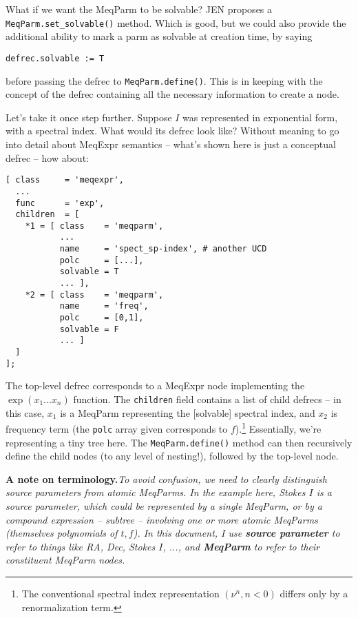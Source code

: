 \documentclass[]{lofar}
\begin{document}
  What if we want the MeqParm to be solvable? JEN \cite{PSS4} proposes a {\tt
  MeqParm.set\_solvable()} method. Which is good, but we could also provide the
  additional ability to mark a parm as solvable at creation time, by saying
  
\begin{verbatim}
defrec.solvable := T
\end{verbatim}
  
  before passing the defrec to {\tt MeqParm.define()}. This is in keeping with
  the concept of the defrec containing all the necessary information to create a
  node.
  
  Let's take it once step further. Suppose $I$ was represented in exponential
  form, with a spectral index. What would its defrec look like? Without meaning
  to go into detail about MeqExpr semantics -- what's shown here is just a
  conceptual defrec -- how about:
  
\begin{verbatim}
[ class     = 'meqexpr',
  ...
  func      = 'exp',
  children  = [ 
    *1 = [ class    = 'meqparm',
           ...
           name     = 'spect_sp-index', # another UCD
           polc     = [...],
           solvable = T
           ... ],
    *2 = [ class    = 'meqparm',
           name     = 'freq',           
           polc     = [0,1],
           solvable = F
           ... ] 
  ]
];
\end{verbatim}
  
  The top-level defrec corresponds to a MeqExpr node implementing the
  $\exp({x_1...x_n})$ function. The {\tt children} field contains a list of
  child defrecs -- in this case, $x_1$ is a MeqParm representing the [solvable]
  spectral index, and $x_2$ is frequency term (the {\tt polc} array given
  corresponds to $f$).\footnote{The conventional spectral index representation 
  $(\nu^n, n<0)$ differs only by a renormalization term.} Essentially, we're
  representing a tiny tree here. The {\tt MeqParm.define()} method can then
  recursively define the child nodes (to any level of nesting!), followed by
  the top-level node.

  {\bf A note on terminology.}{\em To avoid confusion, we need to clearly 
  distinguish source parameters from atomic MeqParms. In the example here, Stokes
  $I$ is a source parameter, which could be represented by a single MeqParm, or
  by a compound expression -- subtree -- involving one or more atomic MeqParms
  (themselves polynomials of $t,f$). In this document, I use {\bf source
  parameter} to refer to things like RA, Dec, Stokes $I$, ..., and {\bf MeqParm} to
  refer to their constituent MeqParm nodes.}
  
\end{document}
